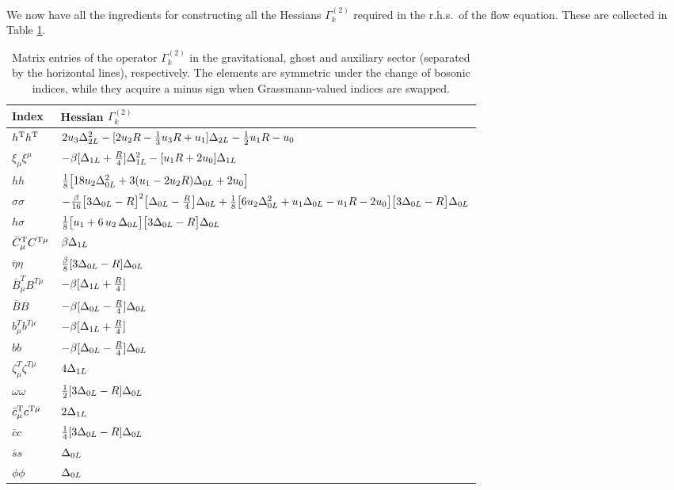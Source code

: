 \documentclass[preprint,preprintnumbers,amsmath,amssymb,nofootinbib,APS]{revtex4}
\let\m=\mu    \let\n=\nu    \let\x=\xi      \let\r=\rho \let\om=\omega
\newcommand{\2}{\sqrt{2\,}}
\newcommand{\cb}{\bar{c}}
\newcommand{\Cb}{\bar{C}}
\newcommand{\eb}{\bar{\eta}}
\begin{document}
\begin{appendix}
We now have all the ingredients for constructing all the Hessians $\Gamma^{(2)}_k$ required in the r.h.s.\ of the flow equation. These are collected
in Table \ref{T.1}. 
%
\begin{table}[t!]
\begin{center}
\begin{tabular}{l|l}
Index & Hessian $\Gamma^{(2)}_k$  \\ \hline \hline
 $h^{\rm T} h^{\rm T}$ 
& $ 2 u_3 \Delta_{2L}^2 -  [2 u_2 R - \tfrac{1}{3} u_3 R + u_1] \Delta_{2L} - \tfrac{1}{2} u_1 R -  u_0$
\\[1.1ex]
%
$\xi_\m \xi^\m$
& $-\beta[\Delta_{1L}+\tfrac{R}{4}]\Delta_{1L}^2-[u_1R+2u_0]\Delta_{1L}$
\\[1.1ex]
%
$h h$
& $ \tfrac{1}{8} \big[ 18 u_2 \Delta_{0L}^2 + 3 (u_1 - 2 u_2 R) \Delta_{0L} + 2 u_0 \big] $
 \\[1.1ex]
%
$\sigma \sigma$ 
& $ -\tfrac{\beta}{16}\big[3\Delta_{0L}-R\big]^2\big[\Delta_{0L}-\tfrac{R}{4}\big]\Delta_{0L} + \tfrac{1}{8} \big[ 6 u_2 \Delta_{0L}^2 + u_1 \Delta_{0L} -u_1 R - 2 u_0 \big] \big[3\Delta_{0L}-R\big] \Delta_{0L}  $
 \\[1.1ex]
%
$h \sigma$ 
& $ \tfrac{1}{8} \big[u_1 + 6 \, u_2 \, \Delta_{0L}\big] \big[3 \Delta_{0L} - R\big] \Delta_{0L}$ \\[1.1ex] \hline
$\Cb^{\rm T}_\m C^{\rm T\m}$
& $ \beta \Delta_{1L}$
 \\[1.1ex] 
%
$\eb \eta$
& $ \tfrac{\beta}{8} [3 \Delta_{0L} - R] \Delta_{0L} $
\\[1.1ex]
%
$\bar B^T_\m B^{T\m}$
& $  -\beta [ \Delta_{1L}+\tfrac{R}{4} ] $
\\[1.1ex]
%
$\bar B B$
& $ -\beta [\Delta_{0L}-\tfrac{R}{4}] \Delta_{0L}$
\\[1.1ex]
%
$b^T_\m b^{T\m}$
& $ -\beta  [\Delta_{1L}+\tfrac{R}{4}]$
\\[1.1ex]
%
$b b$
& $ -\beta [\Delta_{0L}-\tfrac{R}{4}] \Delta_{0L}$
\\[1.1ex] \hline
%
$\zeta^T_\m \zeta^{T\m}$
& $ 4\Delta_{1L} $
 \\[1.1ex]
$\omega \omega$
& $ \tfrac{1}{2} [3\Delta_{0L}-R]\Delta_{0L} $
 \\[1.1ex]
%
$\cb^{\rm T}_\m c^{\rm T\m}$
& $2 \Delta_{1L}  $
\\[1.1ex]
%
$\cb c$
& $ \tfrac{1}{4} [3\Delta_{0L}-R]\Delta_{0L}$
\\[1.1ex]
%
$\bar{s} s$
& $ \Delta_{0L} $
 \\[1.1ex]
 $\phi \phi$
& $ \Delta_{0L} $
 \\[1.1ex] \hline \hline
\end{tabular}
\end{center}
\parbox[c]{\textwidth}{\caption{\label{T.1}{Matrix entries of the operator $\Gamma^{(2)}_k$ in the gravitational, ghost and auxiliary sector (separated by the horizontal lines), respectively. The elements are symmetric under the change of bosonic indices, while they acquire a minus sign when Grassmann-valued indices are swapped.}}}

\end{table}
\end{appendix}
\end{document}

